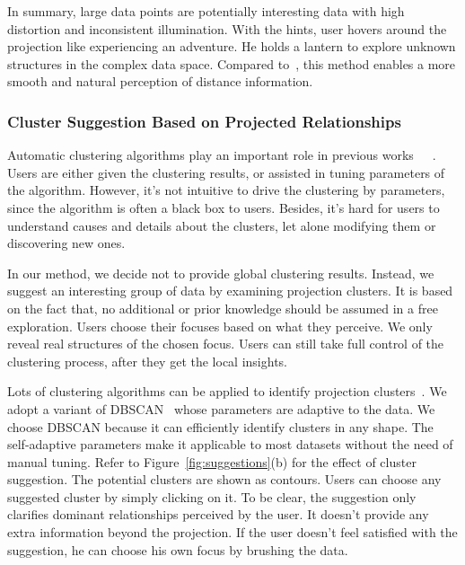 In summary, large data points are potentially interesting data with high distortion and inconsistent illumination. With the hints, user hovers around the projection like experiencing an adventure. He holds a lantern to explore unknown structures in the complex data space. Compared to~\cite{DBLP:journals/tvcg/StahnkeDMT16}, this method enables a more smooth and natural perception of distance information.

\subsubsection{Cluster Suggestion Based on Projected Relationships}
Automatic clustering algorithms play an important role in previous works~\cite{DBLP:conf/ieeevast/NamHMZI07}~\cite{DBLP:journals/cgf/LeeKCSP12}~\cite{DBLP:journals/cgf/LiuWTBP15}. Users are either given the clustering results, or assisted in tuning parameters of the algorithm. However, it's not intuitive to drive the clustering by parameters, since the algorithm is often a black box to users. Besides, it's hard for users to understand causes and details about the clusters, let alone modifying them or discovering new ones.

In our method, we decide not to provide global clustering results. Instead, we suggest an interesting group of data by examining projection clusters. It is based on the fact that, no additional or prior knowledge should be assumed in a free exploration. Users choose their focuses based on what they perceive. We only reveal real structures of the chosen focus. Users can still take full control of the clustering process, after they get the local insights.

Lots of clustering algorithms can be applied to identify projection clusters~\cite{DBLP:conf/ieeevast/Kandogan12}. We adopt a variant of DBSCAN~\cite{zhou2012research} whose parameters are adaptive to the data. We choose DBSCAN because it can efficiently identify clusters in any shape. The self-adaptive parameters make it applicable to most datasets without the need of manual tuning. Refer to Figure~\ref{fig:suggestions}(b) for the effect of cluster suggestion. The potential clusters are shown as contours. Users can choose any suggested cluster by simply clicking on it. To be clear, the suggestion only clarifies dominant relationships perceived by the user. It doesn't provide any extra information beyond the projection. If the user doesn't feel satisfied with the suggestion, he can choose his own focus by brushing the data.

